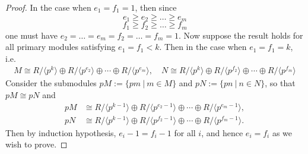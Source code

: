 \documentclass[12pt]{amsbook}
\begin{document}
\begin{proof}
In the case when $e_1 = f_1 = 1$, then since
$$e_1 \geq e_2 \geq \dots \geq e_m$$
$$f_1 \geq f_2 \geq \dots \geq f_m$$
one must have $e_2 = \dots = e_m = f_2 = \dots = f_m = 1$. Now suppose the result holds for all primary modules satisfying $e_1 = f_1 < k$. Then in the case when $e_1 = f_1 = k$, i.e.
    \begin{align*}
        M \cong R/\langle p^k \rangle \oplus R/\langle p^{e_2} \rangle \oplus \cdots\oplus R/\langle p^{e_m} \rangle,
        \quad N \cong R/\langle p^k \rangle \oplus R/\langle p^{f_2} \rangle \oplus \cdots\oplus R/\langle p^{f_m} \rangle
    \end{align*}
Consider the submodules $pM := \{pm\ |\ m \in M\}$ and $pN := \{pn\ |\ n \in N\}$, so that $pM \cong pN$ and
\begin{align*}
        pM &\cong R/\langle p^{k-1} \rangle \oplus R/\langle p^{e_2-1} \rangle \oplus \cdots\oplus R/\langle p^{e_m-1} \rangle,\\
        pN &\cong R/\langle p^{k-1} \rangle \oplus R/\langle p^{f_2-1} \rangle \oplus \cdots\oplus R/\langle p^{f_m-1} \rangle.
    \end{align*}
Then by induction hypothesis, $e_i -1 = f_i -1$ for all $i$, and hence $e_i = f_i$ as we wish to prove.
\end{proof}
\end{document}
